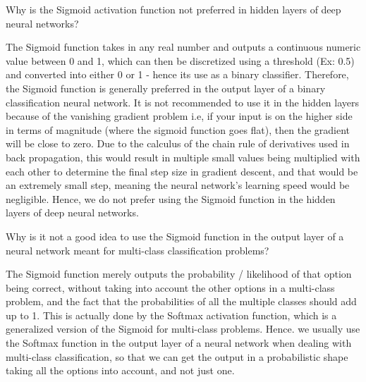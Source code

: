 	\begin{qanda}
		\begin{question}
Why is the Sigmoid activation function not preferred in hidden layers of deep neural networks?
		\end{question}
		\begin{answer}
The Sigmoid function takes in any real number and outputs a continuous numeric value between 0 and 1, which can then be discretized using a threshold (Ex: 0.5) and converted into either 0 or 1 - hence its use as a binary classifier. Therefore, the Sigmoid function is generally preferred in the output layer of a binary classification neural network. It is not recommended to use it in the hidden layers because of the vanishing gradient problem i.e, if your input is on the higher side in terms of magnitude (where the sigmoid function goes flat), then the gradient will be close to zero. Due to the calculus of the chain rule of derivatives used in back propagation, this would result in multiple small values being multiplied with each other to determine the final step size in gradient descent, and that would be an extremely small step, meaning the neural network's learning speed would be negligible. Hence, we do not prefer using the Sigmoid function in the hidden layers of deep neural networks.
		\end{answer}
	\end{qanda}

	\begin{qanda}
		\begin{question}
Why is it not a good idea to use the Sigmoid function in the output layer of a neural network meant for multi-class classification problems?
		\end{question}
		\begin{answer}
The Sigmoid function merely outputs the probability / likelihood of that option being correct, without taking into account the other options in a multi-class problem, and the fact that the probabilities of all the multiple classes should add up to 1. This is actually done by the Softmax activation function, which is a generalized version of the Sigmoid for multi-class problems. Hence. we usually use the Softmax function in the output layer of a neural network when dealing with multi-class classification, so that we can get the output in a probabilistic shape taking all the options into account, and not just one.
		\end{answer}
	\end{qanda}

